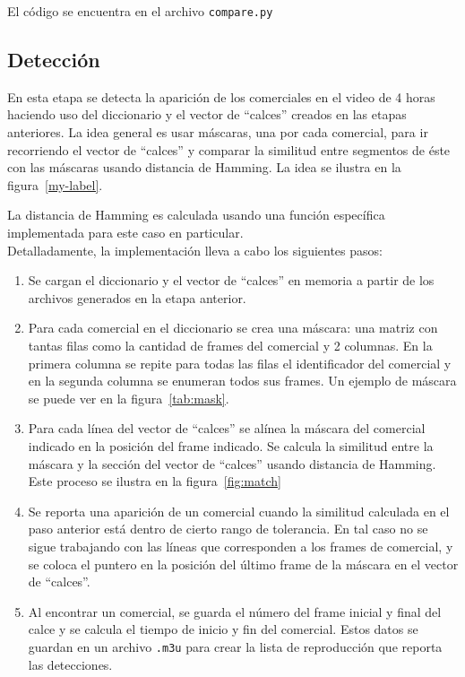 \documentclass[14pt,letterpaper,hidelinks]{extarticle}
\begin{document}
El código se encuentra en el archivo \verb+compare.py+

\subsection{Detección}
En esta etapa se detecta la aparición de los comerciales en el video de 4 horas haciendo uso del diccionario y el vector de ``calces'' creados en las etapas anteriores. La idea general es usar máscaras, una por cada comercial, para ir recorriendo el vector de ``calces'' y comparar la similitud entre segmentos de éste con las máscaras usando distancia de Hamming. La idea se ilustra en la figura~\ref{my-label}.

La distancia de Hamming es calculada usando una función específica implementada para este caso en particular.\\

Detalladamente, la implementación lleva a cabo los siguientes pasos:
\begin{enumerate}
\item Se cargan el diccionario y el vector de ``calces'' en memoria a partir de los archivos generados en la etapa anterior.
\item Para cada comercial en el diccionario se crea una máscara: una matriz con tantas filas como la cantidad de frames del comercial y 2 columnas. En la primera columna se repite para todas las filas el identificador del comercial y en la segunda columna se enumeran todos sus frames. Un ejemplo de máscara se puede ver en la figura~\ref{tab:mask}.
\item Para cada línea del vector de ``calces'' se alínea la máscara del comercial indicado en la posición del frame indicado. Se calcula la similitud entre la máscara y la sección del vector de ``calces'' usando distancia de Hamming. Este proceso se ilustra en la figura~\ref{fig:match}
\item Se reporta una aparición de un comercial cuando la similitud calculada en el paso anterior está dentro de cierto rango de tolerancia. En tal caso no se sigue trabajando con las líneas que corresponden a los frames de comercial, y se coloca el puntero en la posición del último frame de la máscara en el vector de ``calces''.
\item Al encontrar un comercial, se guarda el número del frame inicial y final del calce y se calcula el tiempo de inicio y fin del comercial. Estos datos se guardan en un archivo \verb+.m3u+ para crear la lista de reproducción que reporta las detecciones.
\end{enumerate}
\end{document}
